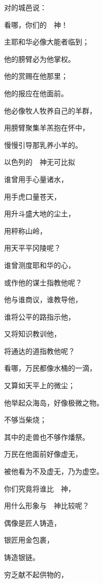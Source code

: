 {\par }{\Q 对{}的城邑说：
\par }{\Q 看哪，你们的　神！
\par }{\Q {}主耶和华必像大能者临到；
\par }{\Q 他的膀臂必为他掌权。
\par }{\Q 他的赏赐在他那里；
\par }{\Q 他的报应在他面前。
\par }{\Q {}他必像牧人牧养自己的羊群，
\par }{\Q 用膀臂聚集羊羔抱在怀中，
\par }{\Q 慢慢引导那乳养小羊的。
\par }{\SH 以色列的　神无可比拟
\par }{\Q {}谁曾用手心量诸水，
\par }{\Q 用手虎口量苍天，
\par }{\Q 用升斗盛大地的尘土，
\par }{\Q 用秤称山岭，
\par }{\Q 用天平平冈陵呢？
\par }{\Q {}谁曾测度耶和华的心，
\par }{\Q 或作他的谋士指教他呢？
\par }{\Q {}他与谁商议，谁教导他，
\par }{\Q 谁将公平的路指示他，
\par }{\Q 又将知识教训他，
\par }{\Q 将通达的道指教他呢？
\par }{\Q {}看哪，万民都像水桶的一滴，
\par }{\Q 又算如天平上的微尘；
\par }{\Q 他举起众海岛，好像极微之物。
\par }{\Q {}不够当柴烧；
\par }{\Q 其中的走兽也不够作燔祭。
\par }{\Q {}万民在他面前好像虚无，
\par }{\Q 被他看为不及虚无，乃为虚空。
\par }{\BB \par }{\Q {}你们究竟将谁比　神，
\par }{\Q 用什么形象与　神比较呢？
\par }{\Q {}偶像是匠人铸造，
\par }{\Q 银匠用金包裹，
\par }{铸造银链。
\par }{\Q {}穷乏献不起{}供物的，
}
